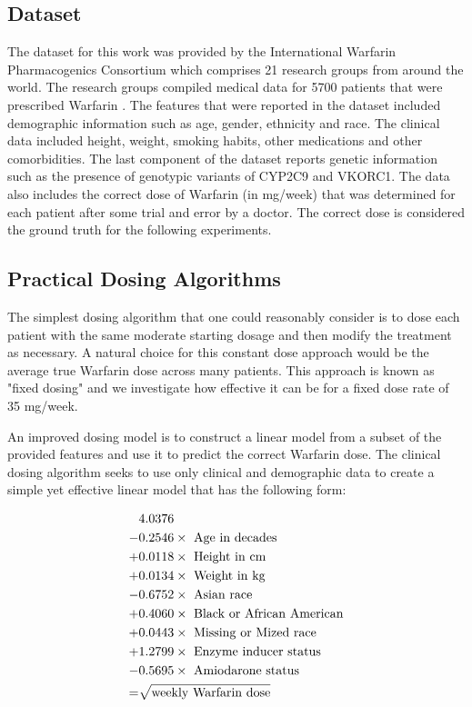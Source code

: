 \documentclass{article}
\begin{document}
\subsection{Dataset}
The dataset for this work was provided by the International Warfarin Pharmacogenics Consortium which comprises 21 research groups from around the world. The research groups compiled medical data for 5700 patients that were prescribed Warfarin \cite{international2009estimation}. The features that were reported in the dataset included demographic information such as age, gender, ethnicity and race. The clinical data included height, weight, smoking habits, other medications and other comorbidities. The last component of the dataset reports genetic information such as the presence of genotypic variants of CYP2C9 and VKORC1. The data also includes the correct dose of Warfarin (in mg/week) that was determined for each patient after some trial and error by a doctor. The correct dose is considered the ground truth for the following experiments. 

\subsection{Practical Dosing Algorithms}
The simplest dosing algorithm that one could reasonably consider is to dose each patient with the same moderate starting dosage and then modify the treatment as necessary. A natural choice for this constant dose approach would be the average true Warfarin dose across many patients. This approach is known as "fixed dosing" and we investigate how effective it can be for a fixed dose rate of 35 mg/week.

An improved dosing model is to construct a linear model from a subset of the provided features and use it to predict the correct Warfarin dose. The clinical dosing algorithm \cite{international2009estimation} seeks to use only clinical and demographic data to create a simple yet effective linear model that has the following form:

\begin{equation}
\begin{split}
    & 4.0376 \\
    - & 0.2546 \times \rm{\ Age \ in \ decades} \\
    + & 0.0118 \times \rm{\ Height \ in \ cm}\\
    + & 0.0134 \times \rm{\ Weight \ in \ kg}\\
    - & 0.6752 \times \rm{\ Asian \ race}\\
    + & 0.4060 \times \rm{\ Black \ or \ African \ American} \\
    + & 0.0443 \times \rm{\ Missing \ or \ Mized \ race} \\
    + & 1.2799 \times \rm{\ Enzyme \ inducer \ status} \\
    - & 0.5695 \times \rm{\ Amiodarone \ status} \\
    = & \sqrt{\rm weekly \ Warfarin \ dose}
\end{split}
\end{equation}
\end{document}
